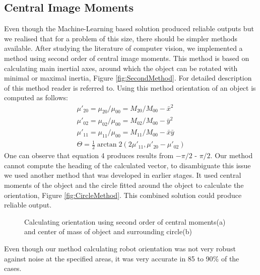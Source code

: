 \subsection{Central Image Moments}
Even though the Machine-Learning based solution produced reliable outputs but we realised that for a problem of this size, there should be simpler methods available. After studying the literature of computer vision, we implemented a method using second order of central image moments. This method is based on calculating main inertial axes, around which the object can be rotated with minimal or maximal inertia, Figure \ref{fig:SecondMethod}. For detailed description of this method reader is referred to\cite{Teague:80}. Using this method orientation of an object is computed as follows:
\begin{align}
\label{equ:centroid}
\mu'_{20} = \mu_{20} / \mu_{00} = M_{20}/M_{00} - \bar{x}^2 \\
\mu'_{02} = \mu_{02} / \mu_{00} = M_{02}/M_{00} - \bar{y}^2 \\
\mu'_{11} = \mu_{11} / \mu_{00} = M_{11}/M_{00} - \bar{x}\bar{y} \\
\Theta = \frac{1}{2} \arctan2 \left( {2\mu'_{11}},{\mu'_{20} - \mu'_{02}} \right) \label{orientationEq}
\end{align}
One can observe that equation 4 produces results from $-\pi/2$ - $\pi/2$. Our method cannot compute the heading of the calculated vector, to disambiguate this issue we used another method that was developed in earlier stages. It used central moments of the object and the circle fitted around the object to calculate the orientation, Figure \ref{fig:CircleMethod}. This combined solution could produce reliable output. 
\begin{figure}[htp]
\begin{center}
\leavevmode
{}
\end{center}
\caption{Calculating orientation using second order of central moments(a) and center of mass of object and surrounding circle(b)}
\end{figure} 
Even though our method calculating robot orientation was not very robust against noise at the specified areas, it was very accurate in 85 to 90\% of the cases. 
